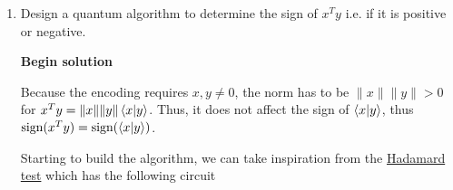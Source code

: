 \documentclass[11pt]{article}
\begin{document}
\begin{enumerate}
\begin{enumerate}
		            Applying the trace

		            \begin{align*}
			            \text{tr}(A) & = \sum_l^n \sum_j^n \sum_k^n \bra{l} (x_j y_k \ket{j}\bra{k}) \ket{l} \\
			                         & = \sum_l^n \sum_j^n \sum_k^n x_j y_k \braket{l|j} \braket{k|l}        \\
			                         & = \sum_l^n \sum_j^n \sum_k^n x_j y_k \braket{k|l} \braket{l|j}
		            \end{align*}

		            \textit{note: also assume that all indexes be it $j,k,l,g$ all start at 1. I just don't want to write it out every time.}

		            The brakets can be rearranged because we are dealing with real numbers.

		            Because $\sum_l \ket{l}\bra{l} = I$ we can replace that in the equation

		            \begin{align*}
			             & = \sum_j^n \sum_k^n x_j y_k \braket{k|I|j} \\
			             & = \sum_j^n \sum_k^n x_j y_k \braket{k|j}
		            \end{align*}


		            Apply the Kronecker delta $\delta_{kj}$ to get

		            \begin{equation*}
			            \sum_j x_j y_j = x^Ty = \text{tr}(A)
		            \end{equation*}

		            Thus it is proven that the inner product $x^Ty = \text{tr}(A)$


		      \item Design a quantum algorithm to determine the sign of $x^Ty$ i.e. if it is positive or negative.

		            \textbf{Begin solution}

		            Because the encoding requires $x,y \ne 0$, the norm has to be $\|x\| \|y\| > 0$ for $x^Ty = \|x\| \|y\| \braket{x|y}$. Thus, it does not affect the sign of $\braket{x|y}$, thus $\text{sign}(x^Ty) = \text{sign}(\braket{x|y})$.

		            Starting to build the algorithm, we can take inspiration from the \href{https://en.wikipedia.org/wiki/Hadamard_test}{Hadamard test} which has the following circuit


\end{enumerate}
\end{enumerate}
\end{document}

